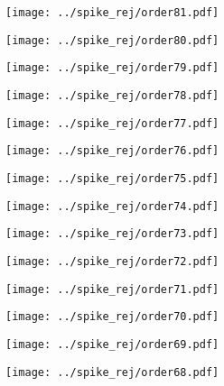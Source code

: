 \documentclass{article}
\begin{document}
\begin{figure}[H]
    \centering
    \texttt{[image: ../spike\_rej/order81.pdf]}
\end{figure}
\begin{figure}[H]
    \centering
    \texttt{[image: ../spike\_rej/order80.pdf]}
\end{figure}
\begin{figure}[H]
    \centering
    \texttt{[image: ../spike\_rej/order79.pdf]}
\end{figure}
\begin{figure}[H]
    \centering
    \texttt{[image: ../spike\_rej/order78.pdf]}
\end{figure}
\begin{figure}[H]
    \centering
    \texttt{[image: ../spike\_rej/order77.pdf]}
\end{figure}
\begin{figure}[H]
    \centering
    \texttt{[image: ../spike\_rej/order76.pdf]}
\end{figure}
\begin{figure}[H]
    \centering
    \texttt{[image: ../spike\_rej/order75.pdf]}
\end{figure}
\begin{figure}[H]
    \centering
    \texttt{[image: ../spike\_rej/order74.pdf]}
\end{figure}
\begin{figure}[H]
    \centering
    \texttt{[image: ../spike\_rej/order73.pdf]}
\end{figure}
\begin{figure}[H]
    \centering
    \texttt{[image: ../spike\_rej/order72.pdf]}
\end{figure}
\begin{figure}[H]
    \centering
    \texttt{[image: ../spike\_rej/order71.pdf]}
\end{figure}
\begin{figure}[H]
    \centering
    \texttt{[image: ../spike\_rej/order70.pdf]}
\end{figure}
\begin{figure}[H]
    \centering
    \texttt{[image: ../spike\_rej/order69.pdf]}
\end{figure}
\begin{figure}[H]
    \centering
    \texttt{[image: ../spike\_rej/order68.pdf]}
\end{figure}
\end{document}
